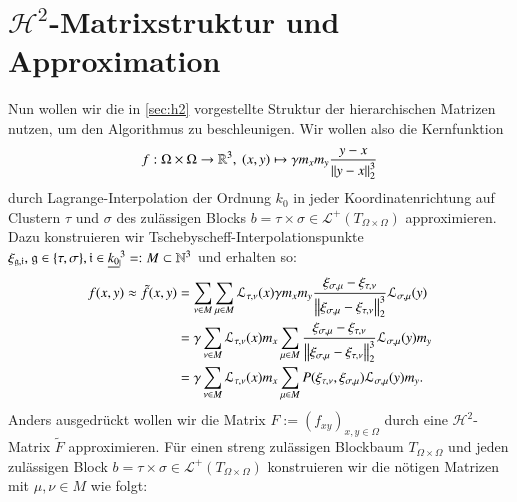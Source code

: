   \section{$\mathcal{H}^2$-Matrixstruktur und Approximation}
  \label{sec:approxf}
    Nun wollen wir die in \autoref{sec:h2} vorgestellte Struktur der hierarchischen Matrizen nutzen, um den Algorithmus zu beschleunigen. Wir wollen also die Kernfunktion
    \[
     f: \Omega \times \Omega \to \mathbb{R}^3, \ (x,y) \mapsto \gamma m_x  m_y \frac{y - x}{\left\lVert y - x\right\rVert^3_2}
    \]
    durch Lagrange-Interpolation der Ordnung $k_0$ in jeder Koordinatenrichtung auf Clustern $\tau$ und $\sigma$ des zulässigen Blocks $b = \tau \times \sigma \in \mathcal{L}^+(T_{\Omega \times \Omega})$ 
    approximieren.
    Dazu konstruieren wir Tschebyscheff-Interpolationspunkte $\xi_{\mathfrak{g}, \mathfrak{i}} \text{, } \mathfrak{g} \in \{ \tau, \sigma \}, \mathfrak{i} \in \haken{k_0}^3 =: M \subset \N^3$
    und erhalten so:
    \begin{align*}
      f(x,y) \approx \tilde f (x,y) 
      &= \sum_{\nu \in M} \sum_{\mu \in M} \mathcal{L}_{\tau, \nu}(x) \gamma m_x m_y \frac{\xi_{\sigma, \mu} - \xi_{\tau, \nu}}{\left\lVert\xi_{\sigma, \mu} - \xi_{\tau, \nu}\right\rVert^3_2} \mathcal{L}_{\sigma, \mu}(y)\\
      &= \gamma \sum_{\nu \in M} \mathcal{L}_{\tau, \nu}(x) m_x \sum_{\mu \in M} \frac{\xi_{\sigma, \mu} - \xi_{\tau, \nu}}{\left\lVert\xi_{\sigma, \mu} - \xi_{\tau, \nu}\right\rVert^3_2} \mathcal{L}_{\sigma, \mu}(y) m_y\\
      &= \gamma \sum_{\nu \in M} \mathcal{L}_{\tau, \nu}(x) m_x \sum_{\mu \in M} P( \xi_{\tau, \nu} , \xi_{\sigma, \mu} ) \mathcal{L}_{\sigma, \mu}(y) m_y.
    \end{align*}
    Anders ausgedrückt wollen wir die Matrix $F := \left(f_{xy} \right)_{x, y \in \Omega}$ durch eine $\mathcal{H}^2$-Matrix $\tilde F$ approximieren. Für einen streng zulässigen Blockbaum $T_{\Omega \times \Omega}$ 
    und jeden zulässigen Block $b = \tau \times \sigma \in \mathcal{L}^+(T_{\Omega \times \Omega})$ konstruieren wir die nötigen Matrizen mit $\mu,\nu \in M$ wie folgt:

